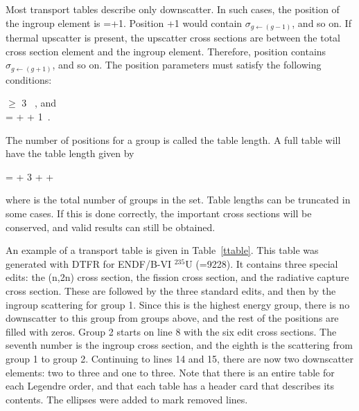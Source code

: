 Most transport tables describe only downscatter.  In such cases, the
position of the ingroup element is =+1.  Position
+1 would contain $\sigma_{g{\leftarrow}(g{-}1)}$, and so
on.  If thermal upscatter is present, the  upscatter
cross sections are between the total cross section element and the
ingroup element.  Therefore, position  contains
$\sigma_{g{\leftarrow}(g{+}1)}$, and so on.  The position parameters
must satisfy the following conditions:
\begin{center}
      $\ge$ 3 ~, and\\
      =  +  + 1~.
\end{center}
The number of positions for a group is called the table length.
A full table will have the table length given by
\begin{center}
      =  + 3 +  + 
\end{center}
where  is the total number of groups in the set.  Table
lengths can be truncated in some cases.  If this is done correctly,
the important cross sections will be conserved, and valid results
can still be obtained.

An example of a transport table is given in Table~\ref{ttable}.
This table was generated with DTFR for ENDF/B-VI $^{235}$U (=9228).
It contains three special edits: the (n,2n) cross section, the fission
cross section, and the radiative capture cross section.  These are
followed by the three standard edits, and then by the ingroup
scattering for group 1.  Since this is the highest energy group,
there is no downscatter to this group from groups above, and the
rest of the positions are filled with zeros.  Group 2 starts on
line 8 with the six edit cross sections.  The seventh number is
the ingroup cross section, and the eighth is the scattering from
group 1 to group 2.  Continuing to lines 14 and 15, there are now
two downscatter elements:  two to three and one to three.
Note that there is an entire table for each Legendre order, and
that each table has a header card that describes its contents.
The ellipses were added to mark removed lines.

\newpage

